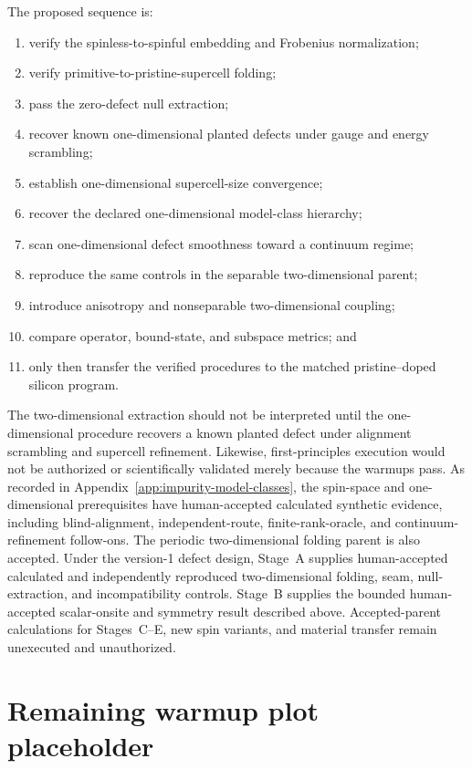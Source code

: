 The proposed sequence is:
\begin{enumerate}
    \item verify the spinless-to-spinful embedding and Frobenius normalization;
    \item verify primitive-to-pristine-supercell folding;
    \item pass the zero-defect null extraction;
    \item recover known one-dimensional planted defects under gauge and energy
          scrambling;
    \item establish one-dimensional supercell-size convergence;
    \item recover the declared one-dimensional model-class hierarchy;
    \item scan one-dimensional defect smoothness toward a continuum regime;
    \item reproduce the same controls in the separable two-dimensional parent;
    \item introduce anisotropy and nonseparable two-dimensional coupling;
    \item compare operator, bound-state, and subspace metrics; and
    \item only then transfer the verified procedures to the matched
          pristine--doped silicon program.
\end{enumerate}
The two-dimensional extraction should not be interpreted until the
one-dimensional procedure recovers a known planted defect under alignment
scrambling and supercell refinement. Likewise, first-principles execution would
not be authorized or scientifically validated merely because the warmups pass.
As recorded in Appendix~\ref{app:impurity-model-classes}, the spin-space and
one-dimensional prerequisites have human-accepted calculated synthetic
evidence, including blind-alignment, independent-route, finite-rank-oracle, and
continuum-refinement follow-ons. The periodic two-dimensional folding parent is
also accepted. Under the version-1 defect design, Stage~A supplies
human-accepted calculated and independently reproduced two-dimensional folding, seam, null-extraction,
and incompatibility controls. Stage~B supplies the bounded human-accepted
scalar-onsite and symmetry result described above. Accepted-parent calculations
for Stages~C--E, new spin variants, and material transfer remain unexecuted and
unauthorized.

\section{Remaining warmup plot placeholder}


